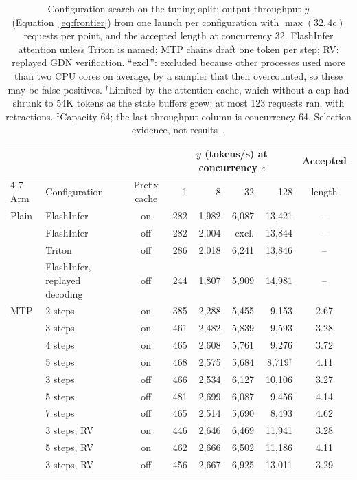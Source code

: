 \begin{table}[!t]
\tablefont\centering
\caption{Configuration search on the tuning split: output throughput $y$ (Equation~\eqref{eq:frontier}) from one launch per configuration with $\max(32,4c)$ requests per point, and the accepted length at concurrency 32. FlashInfer attention unless Triton is named; MTP chains draft one token per step; RV: replayed GDN verification. ``excl.'': excluded because other processes used more than two CPU cores on average, by a sampler that then overcounted, so these may be false positives. $^\dagger$Limited by the attention cache, which without a cap had shrunk to 54K tokens as the state buffers grew: at most 123 requests ran, with retractions. $^\ddagger$Capacity 64; the last throughput column is concurrency 64. Selection evidence, not results~.}
\label{tab:tuning}
\vskip 0.05in
\begin{tabular}{@{}llcrrrrc@{}}\toprule
& & & \multicolumn{4}{c}{$y$ (tokens/s) at concurrency $c$} & Accepted\\\cmidrule(lr){4-7}
Arm & Configuration & Prefix cache & 1 & 8 & 32 & 128 & length\\\midrule
Plain & FlashInfer & on & 282 & 1{,}982 & 6{,}087 & 13{,}421 & --\\
& FlashInfer & off & 282 & 2{,}004 & excl. & 13{,}844 & --\\
& Triton & off & 286 & 2{,}018 & 6{,}241 & 13{,}846 & --\\
& FlashInfer, replayed decoding & off & 244 & 1{,}807 & 5{,}909 & 14{,}981 & --\\\addlinespace
MTP & 2 steps & on & 385 & 2{,}288 & 5{,}455 & 9{,}153 & 2.67\\
& 3 steps & on & 461 & 2{,}482 & 5{,}839 & 9{,}593 & 3.28\\
& 4 steps & on & 465 & 2{,}608 & 5{,}761 & 9{,}276 & 3.72\\
& 5 steps & on & 468 & 2{,}575 & 5{,}684 & 8{,}719$^\dagger$ & 4.11\\
& 3 steps & off & 466 & 2{,}534 & 6{,}127 & 10{,}106 & 3.27\\
& 5 steps & off & 481 & 2{,}699 & 6{,}087 & 9{,}456 & 4.14\\
& 7 steps & off & 465 & 2{,}514 & 5{,}690 & 8{,}493 & 4.62\\
& 3 steps, RV & on & 446 & 2{,}646 & 6{,}469 & 11{,}941 & 3.28\\
& 5 steps, RV & on & 462 & 2{,}666 & 6{,}502 & 11{,}186 & 4.11\\
& 3 steps, RV & off & 456 & 2{,}667 & 6{,}925 & 13{,}011 & 3.29\\

\end{tabular}
\end{table}
